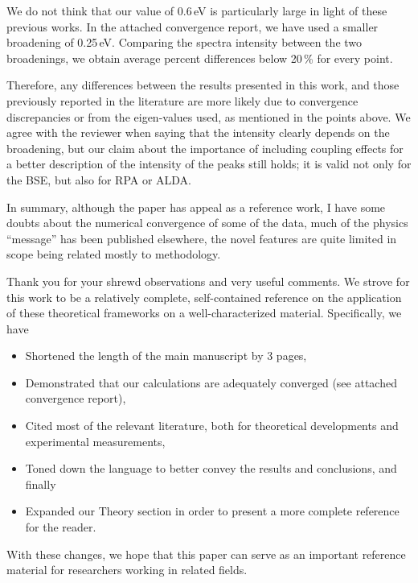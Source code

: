\documentclass[aps,prb,10pt,endfloats]{revtex4-1}
\begin{document}
\begin{enumerate}
\begin{shaded*}
We do not think that our value of 0.6\,eV is particularly large in light of
these previous works. In the attached convergence report, we have used a smaller
broadening of 0.25\,eV. Comparing the spectra intensity between the two
broadenings, we obtain average percent differences below 20\,\% for every
point.

Therefore, any differences between the results presented in this work, and those
previously reported in the literature are more likely due to convergence
discrepancies or from the eigen-values used, as mentioned in the points above.
We agree with the reviewer when saying that the intensity clearly depends on
the broadening, but our claim about the importance of including coupling effects 
for a better description of the intensity of the peaks still holds; it is valid
not only for the BSE, but also for RPA or ALDA.
\end{shaded*}

\end{enumerate}

In summary, although the paper has appeal as a reference work, I have some
doubts about the numerical convergence of some of the data, much of the physics
``message'' has been published elsewhere, the novel features are quite limited
in scope being related mostly to methodology.
\begin{shaded*}
Thank you for your shrewd observations and very useful comments. We strove for
this work to be a relatively complete, self-contained reference on the
application of these theoretical frameworks on a well-characterized material.
Specifically, we have
\begin{itemize}
\item Shortened the length of the main manuscript by 3 pages,
\item Demonstrated that our calculations are adequately converged (see attached
convergence report),
\item Cited most of the relevant literature, both for theoretical developments
and experimental measurements,
\item Toned down the language to better convey the results and conclusions, and
finally
\item Expanded our Theory section in order to present a more complete reference
for the reader.
\end{itemize}

With these changes, we hope that this paper can serve as an important reference
material for researchers working in related fields.
\end{shaded*}
\end{document}
